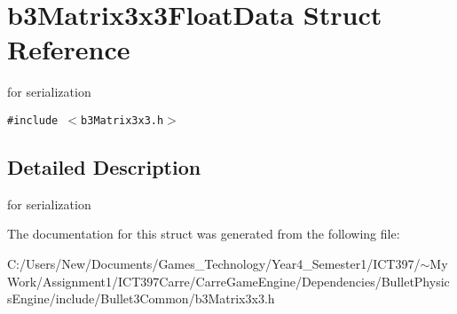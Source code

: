 \hypertarget{structb3_matrix3x3_float_data}{
\section{b3Matrix3x3FloatData Struct Reference}
\label{structb3_matrix3x3_float_data}
}
for serialization  


{\tt \#include $<$b3Matrix3x3.h$>$}



\subsection{Detailed Description}
for serialization 

The documentation for this struct was generated from the following file:\begin{CompactItemize}
\item 
C:/Users/New/Documents/Games\_\-Technology/Year4\_\-Semester1/ICT397/$\sim$My Work/Assignment1/ICT397Carre/CarreGameEngine/Dependencies/BulletPhysicsEngine/include/Bullet3Common/b3Matrix3x3.h\end{CompactItemize}
